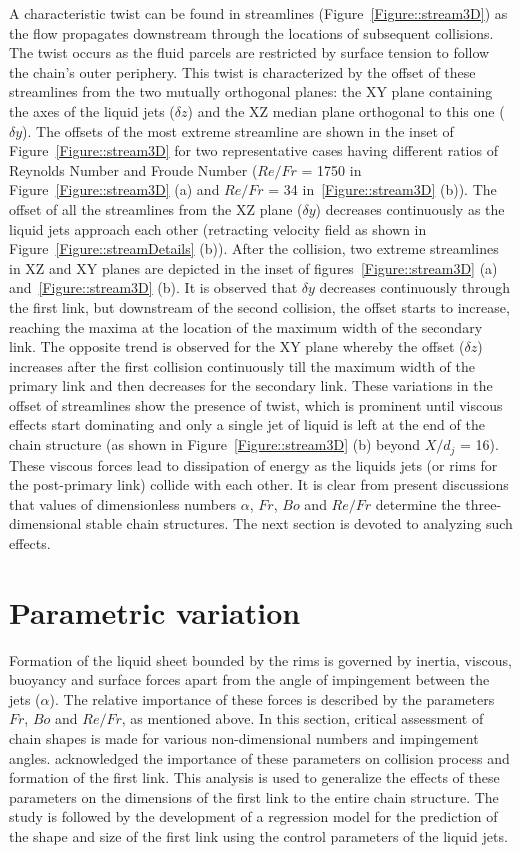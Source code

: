 A characteristic twist can be found in streamlines (Figure~\ref{Figure::stream3D}) as the flow propagates downstream through the locations of subsequent collisions. The twist occurs as the fluid parcels are restricted by surface tension to follow the chain's outer periphery. This twist is characterized by the offset of these streamlines from the two mutually orthogonal planes: the XY plane containing the axes of the liquid jets ($\delta z$) and the XZ median plane orthogonal to this one ($\delta y$). The offsets of the most extreme streamline are shown in the inset of Figure~\ref{Figure::stream3D} for two representative cases having different ratios of Reynolds Number and Froude Number ($Re/Fr$ = 1750 in Figure~\ref{Figure::stream3D} (a) and $Re/Fr$ = 34 in~\ref{Figure::stream3D} (b)). The offset of all the streamlines from the XZ plane ($\delta y$) decreases continuously as the liquid jets approach each other (retracting velocity field as shown in Figure~\ref{Figure::streamDetails} (b)). After the collision, two extreme streamlines in XZ and XY planes are depicted in the inset of figures~\ref{Figure::stream3D} (a) and~\ref{Figure::stream3D} (b). It is observed that $\delta y$ decreases continuously through the first link, but downstream of the second collision, the offset starts to increase, reaching the maxima at the location of the maximum width of the secondary link. The opposite trend is observed for the XY plane whereby the offset ($\delta z$) increases after the first collision continuously till the maximum width of the primary link and then decreases for the secondary link. These variations in the offset of streamlines show the presence of twist, which is prominent until viscous effects start dominating and only a single jet of liquid is left at the end of the chain structure (as shown in Figure~\ref{Figure::stream3D} (b) beyond $X/d_j$ = 16). These viscous forces lead to dissipation of energy as the liquids jets (or rims for the post-primary link) collide with each other. It is clear from present discussions that values of dimensionless numbers $\alpha$, $Fr$, $Bo$ and $Re/Fr$ determine the three-dimensional stable chain structures. The next section is devoted to analyzing such effects.
\section{Parametric variation}
Formation of the liquid sheet bounded by the rims is governed by inertia, viscous, buoyancy and surface forces apart from the angle of impingement between the jets ($\alpha$). The relative importance of these forces is described by the parameters $Fr$, $Bo$ and $Re/Fr$, as mentioned above. In this section, critical assessment of chain shapes is made for various non-dimensional numbers and impingement angles.  \citet{yang2014liquid} acknowledged the importance of these parameters on collision process and formation of the first link. This analysis is used to generalize the effects of these parameters on the dimensions of the first link to the entire chain structure. The study is followed by the development of a regression model for the prediction of the shape and size of the first link using the control parameters of the liquid jets. 
